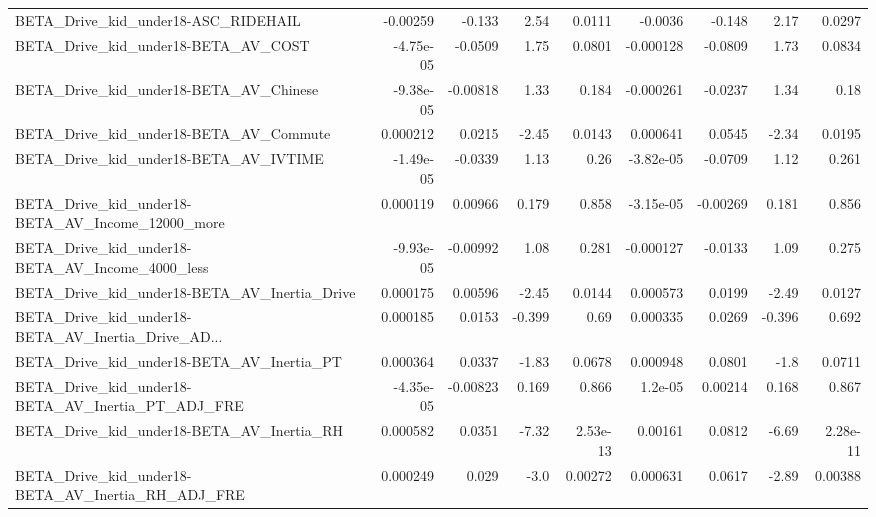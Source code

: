 \begin{tabular}{lrrrrrrrr}
BETA\_Drive\_kid\_under18-ASC\_RIDEHAIL                &    -0.00259 &       -0.133 &     2.54 &   0.0111 &    -0.0036 &      -0.148 &         2.17 &        0.0297 \\
BETA\_Drive\_kid\_under18-BETA\_AV\_COST                &   -4.75e-05 &      -0.0509 &     1.75 &   0.0801 &  -0.000128 &     -0.0809 &         1.73 &        0.0834 \\
BETA\_Drive\_kid\_under18-BETA\_AV\_Chinese             &   -9.38e-05 &     -0.00818 &     1.33 &    0.184 &  -0.000261 &     -0.0237 &         1.34 &          0.18 \\
BETA\_Drive\_kid\_under18-BETA\_AV\_Commute             &    0.000212 &       0.0215 &    -2.45 &   0.0143 &   0.000641 &      0.0545 &        -2.34 &        0.0195 \\
BETA\_Drive\_kid\_under18-BETA\_AV\_IVTIME              &   -1.49e-05 &      -0.0339 &     1.13 &     0.26 &  -3.82e-05 &     -0.0709 &         1.12 &         0.261 \\
BETA\_Drive\_kid\_under18-BETA\_AV\_Income\_12000\_more   &    0.000119 &      0.00966 &    0.179 &    0.858 &  -3.15e-05 &    -0.00269 &        0.181 &         0.856 \\
BETA\_Drive\_kid\_under18-BETA\_AV\_Income\_4000\_less    &   -9.93e-05 &     -0.00992 &     1.08 &    0.281 &  -0.000127 &     -0.0133 &         1.09 &         0.275 \\
BETA\_Drive\_kid\_under18-BETA\_AV\_Inertia\_Drive       &    0.000175 &      0.00596 &    -2.45 &   0.0144 &   0.000573 &      0.0199 &        -2.49 &        0.0127 \\
BETA\_Drive\_kid\_under18-BETA\_AV\_Inertia\_Drive\_AD... &    0.000185 &       0.0153 &   -0.399 &     0.69 &   0.000335 &      0.0269 &       -0.396 &         0.692 \\
BETA\_Drive\_kid\_under18-BETA\_AV\_Inertia\_PT          &    0.000364 &       0.0337 &    -1.83 &   0.0678 &   0.000948 &      0.0801 &         -1.8 &        0.0711 \\
BETA\_Drive\_kid\_under18-BETA\_AV\_Inertia\_PT\_ADJ\_FRE  &   -4.35e-05 &     -0.00823 &    0.169 &    0.866 &    1.2e-05 &     0.00214 &        0.168 &         0.867 \\
BETA\_Drive\_kid\_under18-BETA\_AV\_Inertia\_RH          &    0.000582 &       0.0351 &    -7.32 & 2.53e-13 &    0.00161 &      0.0812 &        -6.69 &      2.28e-11 \\
BETA\_Drive\_kid\_under18-BETA\_AV\_Inertia\_RH\_ADJ\_FRE  &    0.000249 &        0.029 &     -3.0 &  0.00272 &   0.000631 &      0.0617 &        -2.89 &       0.00388 \\

\end{tabular}
